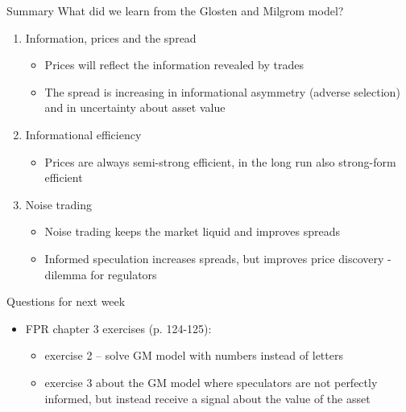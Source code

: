 \documentclass[english,10pt]{beamer}
\begin{document}
\begin{frame}{Summary}
	What did we learn from the Glosten and Milgrom model?
	\begin{enumerate}
		\item Information, prices and the spread
		\begin{itemize}
			\item Prices will reflect the information revealed by trades
			\item The spread is increasing in informational asymmetry (adverse selection) and in uncertainty about asset value
		\end{itemize}
		\item Informational efficiency
		\begin{itemize}
			\item Prices are always semi-strong efficient, in the long run also strong-form efficient
		\end{itemize}
		\item Noise trading
		\begin{itemize}
			\item Noise trading keeps the market liquid and improves spreads
			\item Informed speculation increases spreads, but improves price discovery - dilemma for regulators
		\end{itemize}
	\end{enumerate}
\end{frame}


\begin{frame}{Questions for next week}
	\begin{itemize}
		\item FPR chapter 3 exercises (p. 124-125):
		\begin{itemize}
			\item exercise 2 -- solve GM model with numbers instead of letters
			\item exercise 3 about the GM model where speculators are not perfectly informed, but instead receive a signal about the value of the asset
		\end{itemize}
	\end{itemize}
\end{frame}


\end{document}
